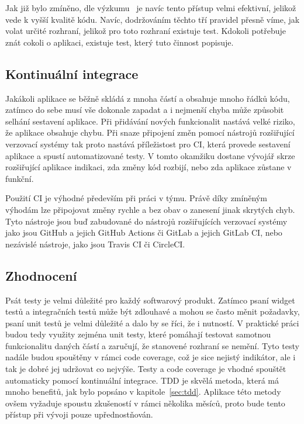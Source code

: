 Jak již bylo zmíněno,
dle výzkumu~\cite{testing_quality} je navíc tento přístup velmi efektivní,
jelikož vede k vyšší kvalitě kódu.
Navíc,
dodržováním těchto tří pravidel přesně víme,
jak volat určité rozhraní,
jelikož pro toto rozhraní existuje test.
Kdokoli potřebuje znát cokoli o aplikaci,
existuje test,
který tuto činnost popisuje.
\cite{tdd}

\subsection{Kontinuální integrace}
\label{chap:ci}

Jakákoli aplikace se běžně skládá z mnoha částí
a obsahuje mnoho řádků kódu,
zatímco do sebe musí vše dokonale zapadat
a i nejmenší chyba může způsobit selhání sestavení aplikace.
Při přidávání nových funkcionalit nastává velké riziko,
že aplikace obsahuje chybu.
Při snaze připojení změn pomocí nástrojů rozšiřující verzovací systémy
tak proto nastává příležistost pro CI,
která provede sestavení aplikace a spustí automatizované testy.
V tomto okamžiku dostane vývojář skrze rozšiřující aplikace indikaci,
zda změny kód rozbijí,
nebo zda aplikace zůstane v funkční.
\cite{ci}

Použití CI je výhodné především při práci v týmu.
Právě díky zmíněným výhodám lze připojovat změny rychle a bez obav o zanesení
jinak skrytých chyb.
Tyto nástroje jsou buď zabudované do nástrojů rozšiřujících verzovací systémy
jako jsou GitHub a jejich GitHub Actions či GitLab a jejich GitLab CI,
nebo nezávislé nástroje,
jako jsou Travis CI či CircleCI.
\cite{ci}

\subsection{Zhodnocení}

Psát testy je velmi důležité pro každý softwarový produkt.
Zatímco psaní widget testů a integračních testů může být zdlouhavé
a mohou se často měnit požadavky,
psaní unit testů je velmi důležité a dalo by se říci,
že i nutností.
V praktické práci budou tedy využity zejména unit testy,
které pomáhají testovat samotnou funkcionalitu daných částí
a zaručují,
že stanovené rozhraní se nemění.
Tyto testy nadále budou spouštěny v rámci code coverage,
což je sice nejistý indikátor,
ale i tak je dobré jej udržovat co nejvýše.
Testy a code coverage je vhodné spouštět automaticky pomocí kontinuální
integrace.
TDD je skvělá metoda,
která má mnoho benefitů,
jak bylo popsáno v kapitole~\ref{sec:tdd}.
Aplikace této metody ovšem vyžaduje spoustu zkušeností
v rámci několika měsíců,
proto bude tento přístup při vývoji pouze upřednostňován.

